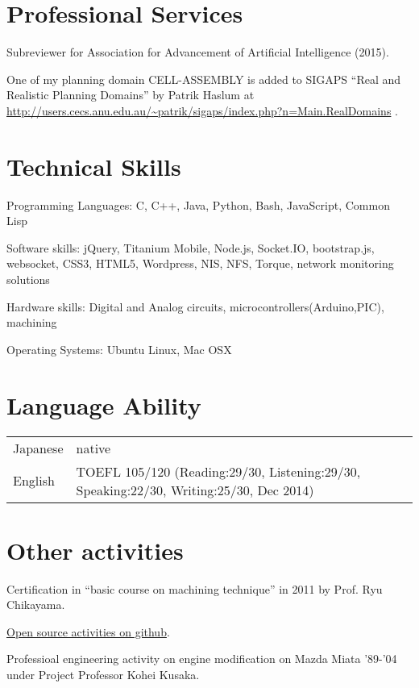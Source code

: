 \documentclass[a4paper]{article}
\begin{document}
\renewcommand{\refname}{Publications}

\let\uline\relax
\nocite{Asai2014}
\nocite{Asai2014b}
\nocite{Asai2015}




\section{Professional Services}

Subreviewer for Association for Advancement of Artificial Intelligence (2015).

One of my planning domain CELL-ASSEMBLY is added to SIGAPS ``Real and
Realistic Planning Domains'' by Patrik Haslum at
\url{http://users.cecs.anu.edu.au/~patrik/sigaps/index.php?n=Main.RealDomains}
.

\section{Technical Skills}

\begin{CV}
 \item[Programming Languages:] C, C++, Java, Python, Bash, JavaScript, Common Lisp
 \item[Software skills:] jQuery, Titanium Mobile,
 Node.js, Socket.IO, bootstrap.js, websocket, CSS3, HTML5, Wordpress, NIS, NFS,
 Torque, network monitoring solutions
 \item[Hardware skills:] Digital and Analog circuits, microcontrollers(Arduino,PIC), machining
 \item[Operating Systems:] Ubuntu Linux, Mac OSX
\end{CV}

\section{Language Ability}
\begin{table}[h] %
\begin{tabular}{ll}
Japanese & native \\
English  & TOEFL 105/120 (Reading:29/30, Listening:29/30, Speaking:22/30, Writing:25/30, Dec 2014)
\end{tabular}
\end{table}

\section{Other activities}

Certification in ``basic course on machining technique'' in 2011 by Prof. Ryu Chikayama.

\href{https://github.com/guicho271828}{Open source activities on github}.

Professioal engineering activity on engine modification
on Mazda Miata '89-'04 under Project Professor Kohei Kusaka.
\end{document}
